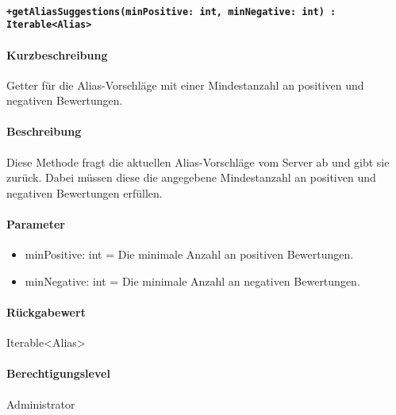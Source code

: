 \paragraph{\texttt{+getAliasSuggestions(minPositive: int, minNegative: int) : Iterable<Alias>}}%
\paragraph*{Kurzbeschreibung}
Getter für die Alias-Vorschläge mit einer Mindestanzahl an positiven und negativen Bewertungen.
\paragraph*{Beschreibung}
Diese Methode fragt die aktuellen Alias-Vorschläge vom Server ab und gibt sie zurück.
Dabei müssen diese die angegebene Mindestanzahl an positiven und negativen Bewertungen erfüllen.
\paragraph*{Parameter}
\begin{itemize}
    \item minPositive: int = Die minimale Anzahl an positiven Bewertungen.
    \item minNegative: int = Die minimale Anzahl an negativen Bewertungen.
\end{itemize}
\paragraph*{Rückgabewert}
Iterable<Alias>
\paragraph*{Berechtigungslevel}
Administrator